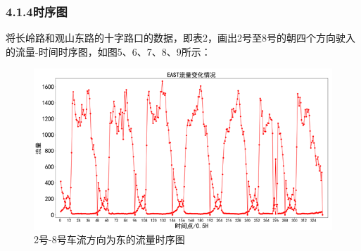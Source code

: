 \documentclass[UTF8]{article}
\begin{document}
    \subsubsection{4.1.4时序图}
    将长岭路和观山东路的十字路口的数据，即表2，画出2号至8号的朝四个方向驶入的流量-时间时序图，如图5、6、7、8、9所示：\\

        \begin{figure}[H]
            \includegraphics[width=\linewidth]{5.png}
            \caption{2号-8号车流方向为东的流量时序图}
        \end{figure}
\end{document}
